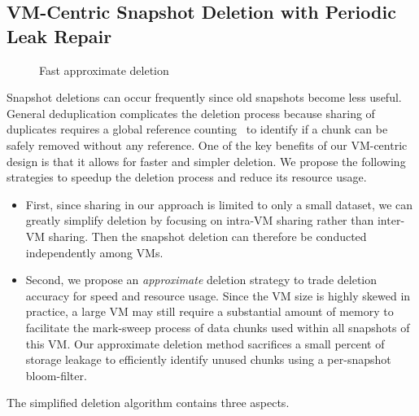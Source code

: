 
\subsection{VM-Centric Snapshot Deletion with Periodic Leak Repair}
\label{sect:delete}


\begin{figure}[htbp]
\vspace{2em}
  \centering
  \caption{Fast approximate deletion}
  \label{fig:deletion_flow}
\end{figure}

Snapshot deletions can occur frequently since old snapshots become less useful.
General deduplication complicates the deletion process because sharing of duplicates
requires a global reference counting~\cite{Guo2011,Fabiano2013} 
 to identify if  a chunk can be  safely removed without any reference.
One of the key benefits of our VM-centric design is that it allows for faster and simpler deletion. 
We propose the following strategies to speedup the deletion process and reduce its resource usage.
\begin{itemize}
\item First, since
sharing in our approach is limited to only a small dataset, we can greatly simplify deletion by focusing
on intra-VM sharing rather than inter-VM sharing. Then the snapshot
 deletion can therefore be conducted independently among VMs.
\item Second,  we propose an {\em approximate} deletion strategy to trade deletion accuracy for speed and
resource usage. Since the VM size is highly skewed in practice,  a large VM may still require
a substantial amount of memory  to facilitate the mark-sweep process of data chunks used within all snapshots
of this VM. 
Our approximate deletion method sacrifices a small percent of storage leakage
to efficiently identify unused chunks using a per-snapshot bloom-filter.
\end{itemize}
The simplified deletion algorithm contains three aspects.
